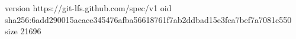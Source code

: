 version https://git-lfs.github.com/spec/v1
oid sha256:6add290015acace345476afba56618761f7ab2ddbad15e3fca7bef7a7081c550
size 21696

